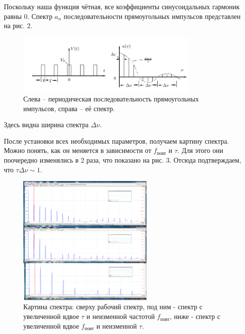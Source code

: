 \documentclass[a4paper, 14pt]{extarticle}%
\newcommand\ECaption[1]{%
     \captionsetup{font=footnotesize}%
     \caption{#1}}
\begin{document}
Поскольку наша функция чётная, все коэффициенты синусоидальных гармоник равны 0. Спектр $a_n$ последовательности прямоугольных импульсов представлен на рис. 2. 

\begin{figure}[h!]
\begin{center}
\includegraphics[width=0.8\textwidth]{a}
\end{center}
\ECaption{Слева -- периодическая
последовательность	
прямоугольных импульсов, справа  --  её спектр.}
\end{figure}
 
Здесь видна ширина спектра $\Delta \nu$. 

После установки всех необходимых параметров, получаем картину спектра.
Можно понять, как он меняется в зависимости от $f_{\text{повт}}$ и $\tau$. Для этого они поочередно изменялись в 2 раза, что показано на рис. 3. Отсюда подтверждаем, что $\tau\Delta\nu \sim 1$.  

\begin{figure}[h!]
\begin{center}
\includegraphics[width=0.6\textwidth]{spec}
\end{center}
\ECaption{Картина спектра: сверху рабочий спектр, под ним - спектр  с увеличенной вдвое $\tau$ и неизменной частотой $f_{\text{повт}}$, ниже -  спектр  с увеличенной вдвое $f_{\text{повт}}$ и неизменной $\tau$. }
\end{figure}
\end{document}
